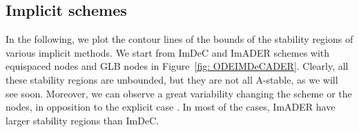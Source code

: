 \subsection{Implicit schemes}
In the following, we plot the contour lines of the bounds of the stability regions of various implicit methods. We start from ImDeC and ImADER schemes with equispaced nodes and GLB nodes in Figure~\ref{fig: ODEIMDeCADER}. 
Clearly, all these stability regions are unbounded, but they are not all A-stable, as we will see soon. Moreover, we can observe a great variability changing the scheme or the nodes, in opposition to the explicit case \cite{Han_Veiga_2021}. In most of the cases, ImADER have larger stability regions than ImDeC.
